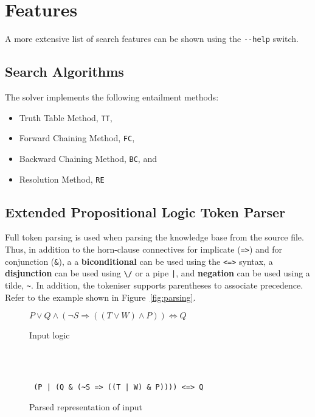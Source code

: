 \section{Features}

A more extensive list of search features can be shown using the \verb`--help`
switch.

\subsection{Search Algorithms}
\label{sub:Search Algorithms}

The solver implements the following entailment methods:

\begin{itemize}
  \item Truth Table Method, \texttt{TT},
  \item Forward Chaining Method, \texttt{FC},
  \item Backward Chaining Method, \texttt{BC}, and
  \item Resolution Method, \texttt{RE}
\end{itemize}

\subsection{Extended Propositional Logic Token Parser}
\label{subs:tokenparser}

Full token parsing is used when parsing the knowledge base from the source file.
Thus, in addition to the horn-clause connectives for implicate (\texttt{=>}) and
for conjunction (\texttt{\&}), a a \textbf{biconditional} can be used using the
\texttt{<=>} syntax, a \textbf{disjunction} can be used using \texttt{\textbackslash/} or
a pipe \texttt{|}, and \textbf{negation} can be used using a tilde, \texttt{\textasciitilde}. In addition,
the tokeniser supports parentheses to associate precedence. Refer to the example
shown in Figure~\ref{fig:parsing}.

\begin{figure*}[h]
  \begin{subfigure}[b]{\textwidth}
    \centering
    $P \vee Q \wedge (\neg S \Rightarrow ((T \vee W) \wedge P)) \Leftrightarrow Q$
    \caption{Input logic}
    \label{fig:parsing-logic}
  \end{subfigure}\\\\
  \begin{subfigure}[b]{\textwidth}
    \centering
    \texttt{
      (P | (Q \& (\textasciitilde S => ((T | W) \& P)))) <=> Q
    }
    \caption{Parsed representation of input}
    \label{fig:parsing-parsed}
  \end{subfigure}
  \caption{Representation of full token parsing}
  \label{fig:parsing}
\end{figure*}

